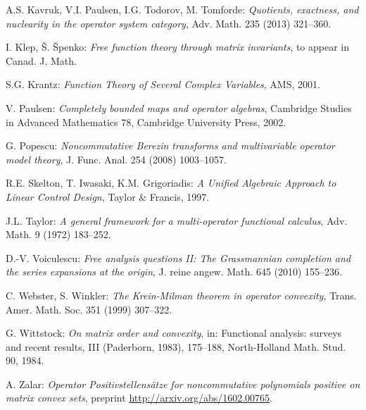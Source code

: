 \documentclass[12pt,makeidx]{amsart}
\numberwithin{equation}{section}
\begin{document}
\begin{thebibliography}{69}
 A.S.  Kavruk, V.I. Paulsen, I.G. Todorov, M. Tomforde:
{\it Quotients, exactness, and nuclearity in the operator system category},
{Adv. Math.} {235} (2013) 321--360.

 	I. Klep, \v S. \v Spenko:
{\it 	Free function theory through matrix invariants}, 
to appear in  	Canad. J. Math.

 S.G. Krantz:
\textit{Function Theory of Several Complex Variables},
AMS, 2001.

V. Paulsen: \textit{Completely bounded maps and operator algebras}, 
Cambridge Studies in Advanced Mathematics 78,
Cambridge University Press, 2002.

G. Popescu: {\it Noncommutative Berezin transforms and multivariable operator model theory},
 J. Func. Anal. 254 (2008) 1003--1057.

R.E. Skelton, T. Iwasaki, K.M. Grigoriadis: 
{\it A Unified Algebraic Approach to Linear Control
Design}, Taylor \& Francis, 1997.

J.L. Taylor: {\it A general framework for a multi-operator functional calculus}, {Adv. Math.} {9} (1972) 183--252.

D.-V. Voiculescu:
{\it Free analysis questions II: The Grassmannian completion and the series
expansions at the origin}, {J. reine angew. Math.} {645} (2010) 155--236.

C. Webster, S. Winkler: {\it The Krein-Milman theorem in operator convexity}, Trans. Amer. Math.
Soc. 351 (1999) 307--322.

G. Wittstock:
{\it On matrix order and convexity}, in: 
Functional analysis: surveys and recent results, III (Paderborn, 1983),  175--188, 
North-Holland Math. Stud. 90, 1984.

A. Zalar:
{\it Operator Positivstellens\"atze for noncommutative polynomials positive on matrix convex sets}, preprint \url{http://arxiv.org/abs/1602.00765}.

\end{thebibliography}
\end{document}
